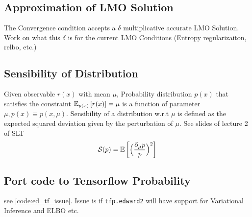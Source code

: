 \documentclass[summaries.tex]{subfiles}
\begin{document}
\subsection{Approximation of LMO Solution}
The Convergence condition accepts a $\delta$ multiplicative accurate LMO Solution.
Work on what this $\delta$ is for the current LMO Conditions (Entropy regularizaiton,
relbo, etc.)

\subsection{Sensibility of Distribution}
Given observable $r(x)$ with mean $\mu$, Probability distribution $p(x)$
that satisfies the constraint $\mathbb{E}_{p(x)}\left[r(x)\right] = \mu$ is a function of parameter
$\mu, p(x) \equiv p(x, \mu)$. Sensibility of a distribution w.r.t $\mu$ is 
defined as the expected squared deviation given by the perturbation of $\mu$.
See slides of lecture 2 of SLT 
$$
\mathcal{S}(p) = \mathbb{E}\left[\Big(\frac{\partial_{\mu} p}{p}\Big)^2\right]
$$

\subsection{Port code to Tensorflow Probability}
see \ref{code:ed_tf_issue}. Issue is if \texttt{tfp.edward2} will have support
for Variational Inference and ELBO etc.

\biblio
\end{document}
